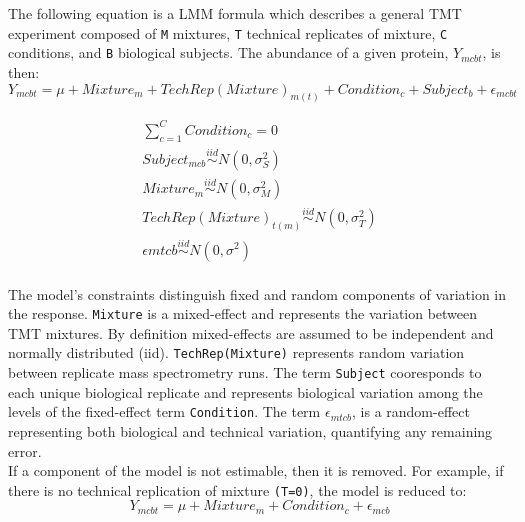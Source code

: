 \documentclass[11pt]{elife}\usepackage[]{graphicx}\usepackage[]{color}
\begin{document}
The following equation is a LMM formula which describes a general TMT
experiment composed of \texttt{M} mixtures, \texttt{T} technical replicates of 
mixture, \texttt{C} conditions, and \texttt{B} biological subjects.
The abundance of a given protein, $Y_{mcbt}$, is then:\\

\begin{equation}
	Y_{mcbt} = \mu + Mixture_m + TechRep(Mixture)_{m(t)} + Condition_c + 
	Subject_b + \epsilon_{mcbt}
\end{equation}


\begin{equation}
  \begin{gathered}
	\sum_{c=1}^{C} Condition_c = 0 \\
	Subject_{mcb} \stackrel{iid}{\sim} N(0,\sigma^2_S) \\
	Mixture_m \stackrel{iid}{\sim} N(0,\sigma^2_M) \\
	TechRep(Mixture)_{t(m)} \stackrel{iid}{\sim} N(0,\sigma^2_T) \\
	\epsilon{mtcb} \stackrel{iid}{\sim} N(0,\sigma^2) \\
  \end{gathered}
\end{equation}

The model's constraints distinguish fixed and random components of 
variation in the response. \texttt{Mixture} is a mixed-effect and represents the
variation between TMT mixtures. By definition mixed-effects are assumed to be
independent and normally distributed (iid).  \texttt{TechRep(Mixture)}
represents random variation between replicate mass spectrometry runs.  The term
\texttt{Subject} cooresponds to each unique biological replicate and represents
biological variation among the levels of the fixed-effect term
\texttt{Condition}. The term $\epsilon_{mtcb}$, is a random-effect representing
both biological and technical variation, quantifying any remaining error.\\

If a component of the model is not estimable, then it is removed. 
For example, if there is no technical replication of mixture 
\texttt{(T=0)}, the model is reduced to: \\

\begin{equation} 
	Y_{mcbt} = \mu + Mixture_m + Condition_c + \epsilon_{mcb}
\end{equation}
\end{document}
